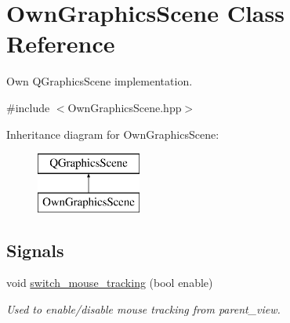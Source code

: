 \hypertarget{classOwnGraphicsScene}{}\section{Own\+Graphics\+Scene Class Reference}
\label{classOwnGraphicsScene}


Own Q\+Graphics\+Scene implementation.  




{\ttfamily \#include $<$Own\+Graphics\+Scene.\+hpp$>$}

Inheritance diagram for Own\+Graphics\+Scene\+:\begin{figure}[H]
\begin{center}
\leavevmode
\includegraphics[height=2.000000cm]{classOwnGraphicsScene}
\end{center}
\end{figure}
\subsection*{Signals}
\begin{DoxyCompactItemize}
\item 
\mbox{\label{classOwnGraphicsScene_af9c3dcf53da255fccf5fb2633d659299}} 
void \mbox{\hyperlink{classOwnGraphicsScene_af9c3dcf53da255fccf5fb2633d659299}{switch\+\_\+mouse\+\_\+tracking}} (bool enable)
\begin{DoxyCompactList}\small\item\em Used to enable/disable mouse tracking from parent\+\_\+view. \end{DoxyCompactList}\end{DoxyCompactItemize}
